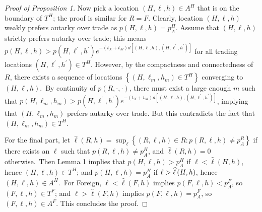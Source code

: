 \documentclass[12pt]{article}
\begin{document}
\begin{proof}[Proof of Proposition 1]
Now pick a location $\left( H,\ell ,h\right) \in A^{H}$ that is on the
boundary of $T^{H}$; the proof is similar for $R=F$. Clearly, location $%
\left( H,\ell ,h\right) $ weakly prefers autarky over trade as $p\left(
H,\ell ,h\right) =p_{A}^{H}$. Assume that $\left( H,\ell ,h\right) $
strictly prefers autarky over trade; this means $p\left( H,\ell ,h\right)
>p\left( H,\ell ^{\prime },h^{\prime }\right) e^{-\left( t_{X}+t_{M}\right) d%
\left[ \left( H,\ell ,h\right) ,\left( H,\ell ^{\prime },h^{\prime }\right) %
\right] }$ for all trading locations $\left( H,\ell ^{\prime },h^{\prime
}\right) \in T^{H}$. However, by the compactness and connectedness of $R$,
there exists a sequence of locations $\left \{ \left( H,\ell
_{m},h_{m}\right) \in T^{H}\right \} $ converging to $\left( H,\ell ,h\right) 
$.\ By continuity of $p\left( R,\cdot ,\cdot \right) $, there must exist a
large enough $m$ such that $p\left( H,\ell _{m},h_{m}\right) >p\left( H,\ell
^{\prime },h^{\prime }\right) e^{-\left( t_{X}+t_{M}\right) d\left[ \left(
H,\ell ,h\right) ,\left( H,\ell ^{\prime },h^{\prime }\right) \right] }$,
implying that $\left( H,\ell _{m},h_{m}\right) $ prefers autarky over
trade. But this contradicts the fact that $\left( H,\ell _{m},h_{m}\right)
\in T^{H}$.

For the final part, let $\widehat{\ell }\left( R,h\right) =\sup_{\ell
}\left \{ \left( R,\ell ,h\right) \in R:p\left( R,\ell ,h\right) \neq
p_{A}^{R}\right \} $ if there exists an $\ell $ such that $p\left( R,\ell
,h\right) \neq p_{A}^{H}$, and $\widehat{\ell }\left( R,h\right) =0$
otherwise.\ Then Lemma 1 implies that $p\left( H,\ell ,h\right) >p_{A}^{H}$
if $\ell <\widehat{\ell }\left( H,h\right) $, hence $\left( H,\ell ,h\right)
\in T^{H}$; and $p\left( H,\ell ,h\right) =p_{A}^{H}$ if $\ell >\widehat{%
\ell }\left( H,h\right) $, hence $\left( H,\ell ,h\right) \in A^{H}$.\ For
Foreign, $\ell <\widehat{\ell }\left( F,h\right) $ implies $p\left( F,\ell
,h\right) <p_{A}^{F}$, so $\left( F,\ell ,h\right) \in T^{F}$; and $\ell >%
\widehat{\ell }\left( F,h\right) $ implies $p\left( F,\ell ,h\right)
=p_{A}^{F}$, so $\left( F,\ell ,h\right) \in A^{F}$. This concludes the
proof.
\end{proof}
\end{document}
